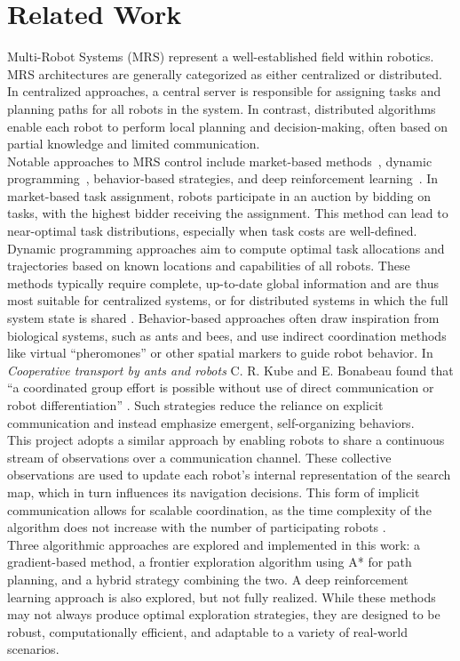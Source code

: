 \section{Related Work}
Multi-Robot Systems (MRS) represent a well-established field within robotics. MRS architectures are generally categorized as either centralized or distributed. In centralized approaches, a central server is responsible for assigning tasks and planning paths for all robots in the system. 
In contrast, distributed algorithms enable each robot to perform local planning and decision-making, often based on partial knowledge and limited communication. \\

Notable approaches to MRS control include market-based methods~\cite{trigui2014market}, dynamic programming~\cite{kato2011dp}, behavior-based strategies, and deep reinforcement learning~\cite{huttenrauch2019deep-swarm}. In market-based task assignment, robots participate in an auction by bidding on tasks, with the highest bidder receiving the assignment. This method can lead to near-optimal task distributions, especially when task costs are well-defined. Dynamic programming approaches aim to compute optimal task allocations and trajectories based on known locations and capabilities of all robots. These methods typically require complete, up-to-date global information and are thus most suitable for centralized systems, or for distributed systems in which the full system state is shared \cite{multi-robot-search-moving-target}. Behavior-based approaches often draw inspiration from biological systems, such as ants and bees, and use indirect coordination methods like virtual “pheromones” or other spatial markers to guide robot behavior. In \textit{Cooperative transport by ants and robots} C. R. Kube and E. Bonabeau found that “a coordinated group effort is possible without use of direct communication or robot differentiation” \cite{kube2000cooperative-ants}. Such strategies reduce the reliance on explicit communication and instead emphasize emergent, self-organizing behaviors. \\

This project adopts a similar approach by enabling robots to share a continuous stream of observations over a communication channel. These collective observations are used to update each robot’s internal representation of the search map, which in turn influences its navigation decisions. This form of implicit communication allows for scalable coordination, as the time complexity of the algorithm does not increase with the number of participating robots \cite{multi-robot-search-moving-target}. \\

Three algorithmic approaches are explored and implemented in this work: a gradient-based method, a frontier exploration algorithm using A* for path planning, and a hybrid strategy combining the two. A deep reinforcement learning approach is also explored, but not fully realized. While these methods may not always produce optimal exploration strategies, they are designed to be robust, computationally efficient, and adaptable to a variety of real-world scenarios.
